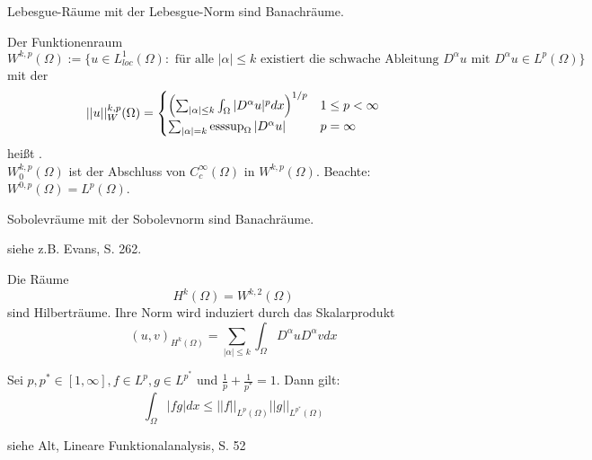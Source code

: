 \begin{thm}
	Lebesgue-Räume mit der Lebesgue-Norm sind Banachräume.
\end{thm}
	
\begin{defn} \label{def:sobolevraum} \label{def_56}
	Der Funktionenraum \marginnote{[56]}
	\[ W^{k,p}(\Omega) := \{ u \in L_{loc}^1(\Omega) : \text{ für alle } |\alpha| \leq k \text{ existiert  die schwache Ableitung } D^\alpha u \text{ mit } D^\alpha u \in L^p(\Omega) \} \]
	mit der 
	\[ ||u||_W^{k,p}(\Omega) = \begin{cases}
		\enbrace*{ \sum_{|\alpha| \leq k} \int_{\Omega} |D^\alpha u|^p dx}^{1/p} & 1 \leq p < \infty \\
		\sum_{|\alpha| = k } \esssup_\Omega |D^\alpha u| & p = \infty \end{cases} \]
	heißt . \\
	$W_0^{k,p}(\Omega)$ ist der Abschluss von $C_c^\infty(\Omega)$ in $W^{k,p}(\Omega)$. Beachte: $W^{0,p}(\Omega) = L^p(\Omega)$.
\end{defn}

\begin{thm}\label{thm_57}
	Sobolevräume mit der Sobolevnorm sind Banachräume. \marginnote{[57]}
\end{thm}
	
	siehe z.B. Evans, S. 262.
	
\begin{bem} \label{bem_58}
	Die Räume \marginnote{[58]}
	\[ H^k(\Omega) = W^{k,2}(\Omega) \]
	sind Hilberträume. Ihre Norm wird induziert durch das Skalarprodukt
	\[ (u,v)_{H^k(\Omega)} = \sum_{|\alpha| \leq k} \int_{\Omega} D^\alpha u D^\alpha v dx \] 
\end{bem}

\begin{thm} \label{hoelder_ungl} \label{thm_59}
	Sei $p, p^* \in [1,\infty], f \in L^p, g \in L^{p^*}$ und $\frac{1}{p} + \frac{1}{p^*} = 1$. Dann gilt: \marginnote{[59]}
	\[ \int_{\Omega} |fg|dx \leq ||f||_{L^p(\Omega)} ||g||_{L^{p^*}(\Omega)} \]
\end{thm}
	
	siehe Alt, \glqq Lineare Funktionalanalysis\grqq, S. 52
	
